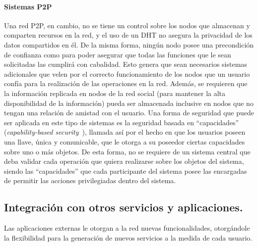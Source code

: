     \paragraph{Sistemas P2P}
    Una red P2P, en cambio, no se tiene un control sobre los nodos que almacenan y
    comparten recursos en la red, y el uso de un DHT no asegura la privacidad de los
    datos compartidos en él. De la misma forma, ningún nodo posee una
    precondición de confianza como para poder asegurar que todas las funciones que
    le sean solicitadas las cumplirá con cabalidad. Esto genera que sean necesarios
    sistemas adicionales que velen por el correcto funcionamiento de los nodos que
    un usuario confía para la realización de las operaciones en la red. Además, se
    requieren que la información replicada en nodos de la red social (para mantener
    la alta disponibilidad de la información) pueda ser almacenada inclusive en
    nodos que no tengan una relación de amistad con el usuario. Una forma de
    seguridad que puede ser aplicada en este tipo de sistemas es la seguridad
    basada en ``capacidades'' (\textit{capability-based security}~\cite{levy1984capability-based}), llamada así por
    el hecho en que los usuarios poseen una llave, única y comunicable, que le otorga
    a su poseedor ciertas capacidades sobre uno o más objetos. De esta forma,
    no se requiere de un sistema central que deba validar cada operación que
    quiera realizarse sobre los objetos del sistema, siendo las ``capacidades''
    que cada participante del sistema posee las encargadas de permitir las acciones
    privilegiadas dentro del sistema.

\subsection{Integración con otros servicios y aplicaciones.}
\label{sec:conectividad}
    Las aplicaciones externas le otorgan a la red nuevas
    funcionalidades, otorgándole la flexibilidad para la generación de nuevos
    servicios a la medida de cada usuario.
    
